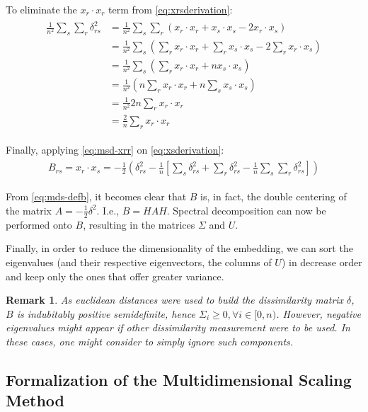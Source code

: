 \documentclass[12pt]{report}
\newtheorem{remark}{Remark}[section]
\begin{document}
To eliminate the $x_r\cdot x_r$ term from \ref{eq:xrsderivation}:
\begin{align}
\label{eq:msd-xrr}
\begin{split}
\frac{1}{n^2} \sum_s\sum_r\delta_{rs}^2 &= \frac{1}{n^2} \sum_s\sum_r(x_r\cdot x_r + x_s\cdot x_s -2x_r\cdot x_s)\\
&= \frac{1}{n^2}\sum_s(\sum_r x_r\cdot x_r + \sum_r x_s\cdot x_s -2\sum_r x_r\cdot x_s)\\
&= \frac{1}{n^2}\sum_s(\sum_r x_r\cdot x_r + n x_s\cdot x_s) \\
&= \frac{1}{n^2}(n \sum_r x_r\cdot x_r + n \sum_s x_s \cdot x_s) \\
&= \frac{1}{n^2} 2n \sum_r x_r\cdot x_r \\
&= \frac{2}{n} \sum_r x_r\cdot x_r
\end{split}
\end{align}

Finally, applying \ref{eq:msd-xrr} on \ref{eq:xsderivation}:
\begin{align}
\label{eq:mds-defb}
\begin{split}
B_{rs} = x_r\cdot x_s = -\frac{1}{2} (\delta_{rs}^2 - \frac{1}{n} [\sum_s \delta_{rs}^2 + \sum_r \delta_{rs}^2 - \frac{1}{n}\sum_s \sum_r \delta_{rs}^2])
\end{split}
\end{align}

From \ref{eq:mds-defb}, it becomes clear that $B$ is, in fact, the double centering of the matrix $A=-\frac{1}{2}\delta^2$. I.e., $B=HAH$. Spectral decomposition can now be performed onto $B$, resulting in the matrices $\Sigma$ and $U$.

Finally, in order to reduce the dimensionality of the embedding, we can sort the eigenvalues (and their respective eigenvectors, the columns of $U$) in decrease order and keep only the ones that offer greater variance.

\begin{remark}
	As euclidean distances were used to build the dissimilarity matrix $\delta$, $B$ is indubitably positive semidefinite, hence $\Sigma_i \ge 0, \forall i\in [0, n)$. However, negative eigenvalues might appear if other dissimilarity measurement were to be used. In these cases, one might consider to simply ignore such components.
\end{remark}

\subsection{Formalization of the Multidimensional Scaling Method}
\end{document}
